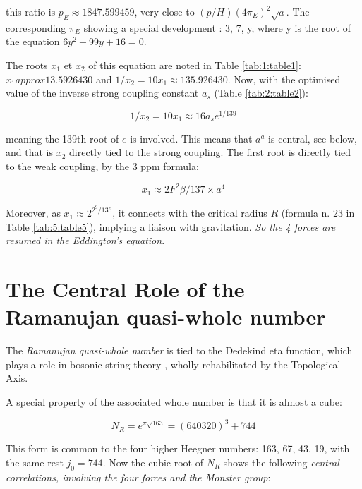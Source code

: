 \documentclass[a4paper,9pt]{article}
\begin{document}
this ratio is $p_E \approx 1847.599459$, very close to $(p/H)(4\pi_E)^2\sqrt a$. The corresponding $\pi_E$ showing a special development : 3, 7, y, where y is the root of the equation $6y^2 - 99 y + 16 = 0$. 

The roots $x_1$ et $x_2$ of this equation are noted in Table \ref{tab:1:table1}: $x_1 approx 13.5926430$ and $1/x_2 = 10 x_1 \approx  135.926430$. Now, with the optimised value of the inverse strong coupling constant $a_s$ (Table \ref{tab:2:table2}):

\begin{equation}
 1/x_2 = 10 x_1 \approx 16 a_s e^{1/139}     
\end{equation}

meaning the 139th root of $e$ is involved. This means that $a^a$ is central, see below, and that is $x_2$ directly tied to the strong coupling. The first root is directly tied to the weak coupling, by the 3 ppm formula:

\begin{equation}
  x_1 \approx 2F^2 \beta /137\times a^4    
\end{equation}

Moreover, as $x_1 \approx 2^{2^9/136}$, it connects with the critical radius $R$ (formula n. 23 in Table \ref{tab:5:table5}), implying a liaison with gravitation. \textit{So the 4 forces are resumed in the Eddington's equation}.







\section{The Central Role of the Ramanujan quasi-whole number}

The \textit{Ramanujan quasi-whole number} is tied to the Dedekind eta function, which plays a role in bosonic string theory \cite{Apostol}\cite{Lovelace}, wholly rehabilitated by the Topological Axis.


A special property of the associated whole number is that it is almost a cube:

\begin{equation}
N_R = e^{\pi \sqrt{163}} = (640320)^3 + 744
\end{equation}

This form is common to the four higher Heegner numbers: 163, 67, 43, 19, with the same rest $j_0 = 744$. Now the cubic root of $N_R$ shows the following \textit {central correlations, involving the four forces and the Monster group}:
\end{document}
